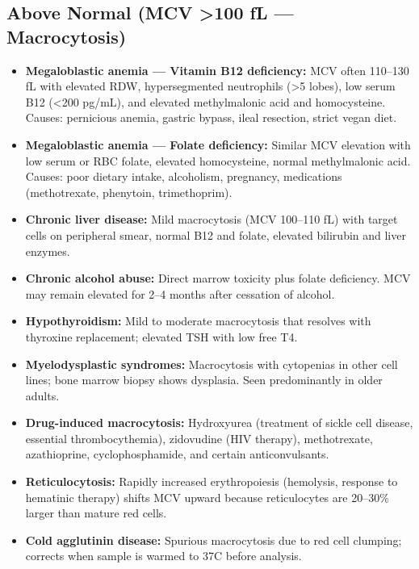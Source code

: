 \subsection*{Above Normal (MCV >100 fL --- Macrocytosis)}
\begin{itemize}
  \item \textbf{Megaloblastic anemia --- Vitamin B12 deficiency:} MCV often 110--130 fL with elevated RDW, hypersegmented neutrophils (>5 lobes), low serum B12 (<200 pg/mL), and elevated methylmalonic acid and homocysteine. Causes: pernicious anemia, gastric bypass, ileal resection, strict vegan diet.
  \item \textbf{Megaloblastic anemia --- Folate deficiency:} Similar MCV elevation with low serum or RBC folate, elevated homocysteine, normal methylmalonic acid. Causes: poor dietary intake, alcoholism, pregnancy, medications (methotrexate, phenytoin, trimethoprim).
  \item \textbf{Chronic liver disease:} Mild macrocytosis (MCV 100--110 fL) with target cells on peripheral smear, normal B12 and folate, elevated bilirubin and liver enzymes.
  \item \textbf{Chronic alcohol abuse:} Direct marrow toxicity plus folate deficiency. MCV may remain elevated for 2--4 months after cessation of alcohol.
  \item \textbf{Hypothyroidism:} Mild to moderate macrocytosis that resolves with thyroxine replacement; elevated TSH with low free T4.
  \item \textbf{Myelodysplastic syndromes:} Macrocytosis with cytopenias in other cell lines; bone marrow biopsy shows dysplasia. Seen predominantly in older adults.
  \item \textbf{Drug-induced macrocytosis:} Hydroxyurea (treatment of sickle cell disease, essential thrombocythemia), zidovudine (HIV therapy), methotrexate, azathioprine, cyclophosphamide, and certain anticonvulsants.
  \item \textbf{Reticulocytosis:} Rapidly increased erythropoiesis (hemolysis, response to hematinic therapy) shifts MCV upward because reticulocytes are 20--30\% larger than mature red cells.
  \item \textbf{Cold agglutinin disease:} Spurious macrocytosis due to red cell clumping; corrects when sample is warmed to 37\textdegree{}C before analysis.
\end{itemize}

